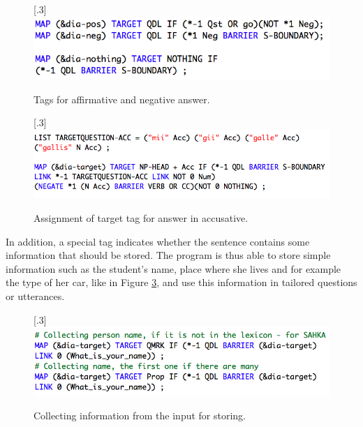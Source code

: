 \documentclass[11pt]{article}
\begin{document}
\begin{figure}%
\begin{center}
\scalebox{.3}[.3]{\includegraphics{presentation/img/aff_or_neg_colours.png}}\\
\caption{Tags for affirmative and negative answer. 
}
\label{afforneg}
\end{center}
\end{figure}

\begin{figure}%
\begin{center}
\scalebox{.3}[.3]{\includegraphics{presentation/img/target_acc.png}}\\
\caption{Assignment of target tag for answer in accusative. 
}
\label{targettag}
\end{center}
\end{figure}

In addition, a special tag indicates whether the sentence contains some information that should be stored. The program is thus able to store simple information such as the student’s name, place where she lives and for example the type of her car, like in Figure \ref{nametag}, and use this information in tailored questions or utterances.

\begin{figure}%
\begin{center}
\scalebox{.3}[.3]{\includegraphics{presentation/img/picking_name_new.png}}\\
\caption{Collecting information from the input for storing. 
}
\label{nametag}
\end{center}
\end{figure}
\end{document}
